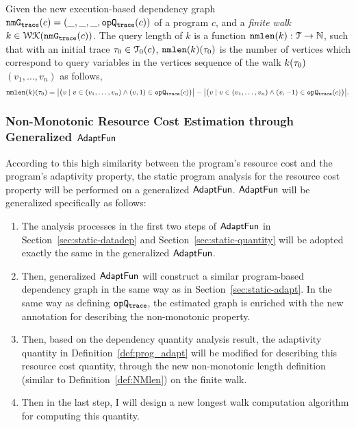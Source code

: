 \begin{enumerate}
{\begin{defn}
 \label{def:NMlen}
 Given 
 the new execution-based dependency graph $\mathtt{nmG_{trace}}({c}) = (\_, \_, \_, \mathtt{opQ_{trace}}({c}))$ of a program $c$,
 and a \emph{finite walk} 
 $k \in \mathcal{WK}(\mathtt{nmG_{trace}}(c))$. 
 The query length of $k$ is a function $\mathtt{nmlen}(k): \mathcal{T} \to \mathbb{N}$, such that with an initial trace $\mathtt{\tau}_0 \in \mathcal{T}_0(c)$, $\mathtt{nmlen}(k)(\mathtt{\tau}_0)$ is
 the number of vertices which correspond to query variables in the vertices sequence of the walk $k(\mathtt{\tau}_0)$
 $(v_1, \ldots, v_{n})$ as follows, 
 \[
 \NMlen(k)(\trace_0) = 
 \left\vert \big( v \mid v \in (v_1, \ldots, v_{n}) \land (v, 1) \in \traceOP(c) \big) \right \vert
 - 
 \left\vert \big( v \mid v \in (v_1, \ldots, v_{n}) \land (v, -1) \in \traceOP(c) \big) \right \vert.
 \]
 \end{defn}}
\end{enumerate}
\subsubsection{Non-Monotonic Resource Cost Estimation through Generalized $\textsf{AdaptFun}$}
According to this high similarity between the program's resource cost and the 
program's adaptivity property, the static program analysis for the resource cost property will 
be performed on a generalized $\textsf{AdaptFun}$. $\textsf{AdaptFun}$ will be generalized specifically as follows:
\begin{enumerate}
 \item The analysis processes in the first two steps of $\textsf{AdaptFun}$ in Section~\ref{sec:static-datadep}
 and Section~\ref{sec:static-quantity} will be adopted exactly the same in the generalized $\textsf{AdaptFun}$.
 \item Then, generalized $\textsf{AdaptFun}$ will construct a similar program-based dependency graph 
 in the same way as in Section~\ref{sec:static-adapt}. In the same way as defining $\mathtt{opQ_{trace}}$, 
 the estimated graph is enriched with the new annotation for describing the non-monotonic property.
 \item Then, based on the dependency quantity analysis result, the adaptivity quantity in Definition~\ref{def:prog_adapt}
 will be modified for describing this resource cost quantity, through the new non-monotonic length definition (similar to Definition~\ref{def:NMlen}) on the finite walk.
 \item Then in the last step, I will design a new longest walk computation algorithm for computing this quantity.
\end{enumerate}

